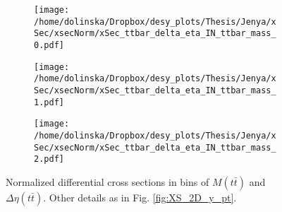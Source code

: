 \begin{figure}[H]
\centering
\begin{subfigure}
  \centering
  \texttt{[image: /home/dolinska/Dropbox/desy\_plots/Thesis/Jenya/xSec/xsecNorm/xSec\_ttbar\_delta\_eta\_IN\_ttbar\_mass\_0.pdf]}
\end{subfigure}
\begin{subfigure}
  \centering
  \texttt{[image: /home/dolinska/Dropbox/desy\_plots/Thesis/Jenya/xSec/xsecNorm/xSec\_ttbar\_delta\_eta\_IN\_ttbar\_mass\_1.pdf]}
\end{subfigure}
\begin{subfigure}
  \centering
  \texttt{[image: /home/dolinska/Dropbox/desy\_plots/Thesis/Jenya/xSec/xsecNorm/xSec\_ttbar\_delta\_eta\_IN\_ttbar\_mass\_2.pdf]}
\end{subfigure}
\caption{Normalized differential cross sections in bins of $M(t\bar{t})$ and $\Delta\eta(t\bar{t})$. Other details as in Fig. \ref{fig:XS_2D_y_pt}.}
\label{fig:XS_2D_eta_Mtt}
\end{figure}

